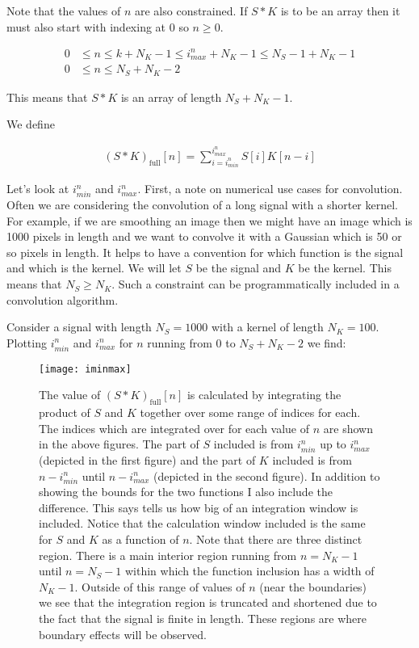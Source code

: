 \documentclass[12pt]{article}
\begin{document}
Note that the values of $n$ are also constrained. If $S\ast K$ is to be an array then it must also start with indexing at $0$ so $n\ge0$.

\begin{align}
0 &\le n \le k+N_K -1 \le i_{max}^n + N_K - 1 \le N_S - 1 + N_K - 1\\
0 &\le n \le N_S + N_K - 2
\end{align}

This means that $S\ast K$ is an array of length $N_S + N_K - 1$.

We define

\begin{align}
(S \ast K)_{\text{full}}[n] = \sum_{i=i_{min}^n}^{i_{max}^n} S[i]K[n-i]
\end{align}

Let's look at $i_{min}^n$ and $i_{max}^n$. First, a note on numerical use cases for convolution. Often we are considering the convolution of a long signal with a shorter kernel. For example, if we are smoothing an image then we might have an image which is 1000 pixels in length and we want to convolve it with a Gaussian which is 50 or so pixels in length. It helps to have a convention for which function is the signal and which is the kernel. We will let $S$ be the signal and $K$ be the kernel. This means that $N_S \ge N_K$. Such a constraint can be programmatically included in a convolution algorithm.

Consider a signal with length $N_S = 1000$ with a kernel of length $N_K = 100$. Plotting $i_{min}^n$ and $i_{max}^n$ for $n$ running from $0$ to $N_S + N_K - 2$ we find:


\begin{figure}
\centering
\texttt{[image: iminmax]}
\caption{The value of $(S\ast K)_{\text{full}}[n]$ is calculated by integrating the product of $S$ and $K$ together over some range of indices for each. The indices which are integrated over for each value of $n$ are shown in the above figures. The part of $S$ included is from $i_{min}^n$ up to $i_{max}^n$ (depicted in the first figure) and the part of $K$ included is from $n-i_{min}^n$ until $n-i_{max}^n$ (depicted in the second figure). In addition to showing the bounds for the two functions I also include the difference. This says tells us how big of an integration window is included. Notice that the calculation window included is the same for $S$ and $K$ as a function of $n$. Note that there are three distinct region. There is a main interior region running from $n=N_K-1$ until $n=N_S-1$ within which the function inclusion has a width of $N_K-1$. Outside of this range of values of $n$ (near the boundaries) we see that the integration region is truncated and shortened due to the fact that the signal is finite in length. These regions are where boundary effects will be observed.}
\end{figure}
\end{document}
